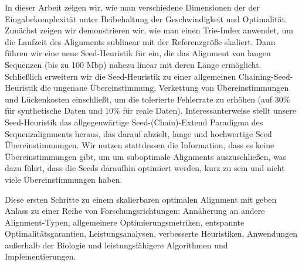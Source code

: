 In dieser Arbeit zeigen wir, wie man verschiedene Dimensionen der
der Eingabekomplexität unter Beibehaltung der Geschwindigkeit und Optimalität. Zunächst zeigen wir
demonstrieren wir, wie man einen Trie-Index anwendet, um die Laufzeit des Alignments sublinear
mit der Referenzgröße skaliert. Dann führen wir eine neue Seed-Heuristik für \A ein, die
das Alignment von langen Sequenzen (bis zu 100 Mbp) nahezu linear mit deren
Länge ermöglicht. Schließlich erweitern wir die Seed-Heuristik zu einer allgemeinen Chaining-Seed-Heuristik
die ungenaue Übereinstimmung, Verkettung von Übereinstimmungen und Lückenkosten einschließt, um die
tolerierte Fehlerrate zu erhöhen (auf 30\% für synthetische Daten und 10\% für reale Daten).
Interessanterweise stellt unsere Seed-Heuristik das allgegenwärtige Seed-(Chain)-Extend
Paradigma des Sequenzalignments heraus, das darauf abzielt, lange und hochwertige Seed
Übereinstimmungen. Wir nutzen stattdessen die Information, dass es keine Übereinstimmungen gibt, um
um suboptimale Alignments auszuschließen, was dazu führt, dass die Seeds daraufhin optimiert werden, kurz zu sein und nicht
viele Übereinstimmungen haben.

Diese ersten Schritte zu einem skalierbaren optimalen Alignment mit \A geben Anlass zu einer Reihe von
Forschungsrichtungen: Annäherung an andere Alignment-Typen, allgemeinere
Optimierungsmetriken, entspannte Optimalitätsgarantien, Leistungsanalysen,
verbesserte Heuristiken, Anwendungen außerhalb der Biologie und leistungsfähigere
Algorithmen und Implementierungen.
